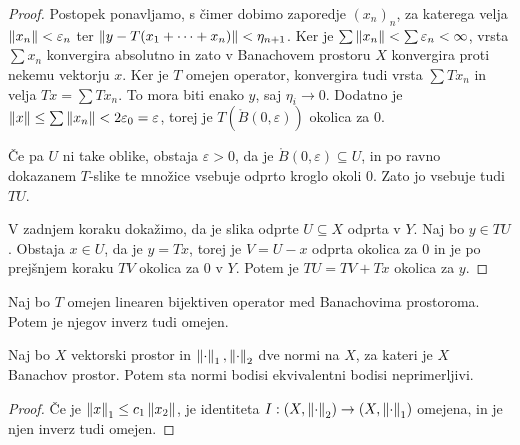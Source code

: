 \begin{proof}
  Postopek ponavljamo, s čimer dobimo zaporedje $(x_n)_n$, za katerega velja
  $\left\lVert x_n\right\rVert < \varepsilon_n$ ter $\left\lVert y - T(x_1 + \cdots + x_n)\right\rVert < \eta_{n+1}$.
  Ker je $\sum \left\lVert x_n\right\rVert < \sum \varepsilon_n < \infty$, vrsta $\sum x_n$
  konvergira absolutno in zato v Banachovem prostoru $X$ konvergira proti nekemu
  vektorju $x$.
  Ker je $T$ omejen operator, konvergira tudi vrsta $\sum T x_n$ in velja $Tx =
  \sum T x_n$.
  To mora biti enako $y$, saj $\eta_i \to 0$.
  Dodatno je $\left\lVert x\right\rVert \le \sum \left\lVert x_n\right\rVert < 2 \varepsilon_0 = \varepsilon$,
  torej je $T(\mathring{B}(0, \varepsilon))$ okolica za $0$.

  Če pa $U$ ni take oblike, obstaja $\varepsilon > 0$, da je $\mathring{B}(0,
  \varepsilon) \subseteq U$, in po ravno dokazanem $T$-slike te množice vsebuje
  odprto kroglo okoli $0$.
  Zato jo vsebuje tudi $TU$.

  V zadnjem koraku dokažimo, da je slika odprte $U \subseteq X$ odprta v $Y$.
  Naj bo $y \in TU$.
  Obstaja $x \in U$, da je $y = Tx$, torej je $V = U - x$ odprta okolica za $0$
  in je po prejšnjem koraku $TV$ okolica za $0$ v $Y$.
  Potem je $TU = TV + Tx$ okolica za $y$.
\end{proof}

\begin{posledica}
  Naj bo $T$ omejen linearen bijektiven operator med Banachovima prostoroma.
  Potem je njegov inverz tudi omejen.
\end{posledica}

\begin{posledica}
  Naj bo $X$ vektorski prostor in $\left\lVert\cdot\right\rVert_1, \left\lVert\cdot\right\rVert_2$ dve normi na
  $X$, za kateri je $X$ Banachov prostor.
  Potem sta normi bodisi ekvivalentni bodisi neprimerljivi.
\end{posledica}

\begin{proof}
  Če je $\left\lVert x\right\rVert_1 \le c_1 \left\lVert x_2\right\rVert$, je identiteta $I: (X, \left\lVert\cdot\right\rVert_2)
  \to (X, \left\lVert\cdot\right\rVert_1)$ omejena, in je njen inverz tudi omejen.
\end{proof}

